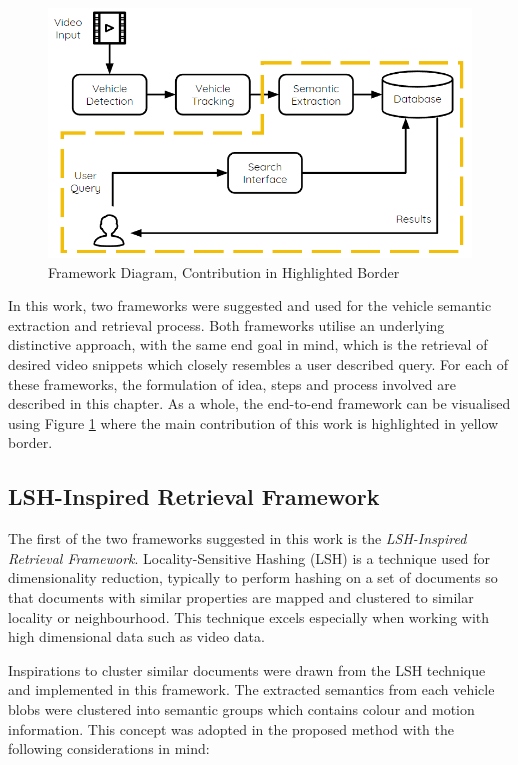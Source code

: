 \begin{figure}[hbt!]\centering
\includegraphics[width=.9\textwidth]{image/new/framework_new.PNG}
\caption{Framework Diagram, Contribution in Highlighted Border}
\label{fig:framework}
\end{figure}


In this work, two frameworks were suggested and used for the vehicle semantic extraction and retrieval process. Both frameworks utilise an underlying distinctive approach, with the same end goal in mind, which is the retrieval of desired video snippets which closely resembles a user described query. For each of these frameworks, the formulation of idea, steps and process involved are described in this chapter. 
As a whole, the end-to-end framework can be visualised using Figure \ref{fig:framework} where the main contribution of this work is highlighted in yellow border. 

\subsection{LSH-Inspired Retrieval Framework}
The first of the two frameworks suggested in this work is the \textit{LSH-Inspired Retrieval Framework}. Locality-Sensitive Hashing (LSH) is a technique used for dimensionality reduction, typically to perform hashing on a set of documents so that documents with similar properties are mapped and clustered to similar locality or neighbourhood. This technique excels especially when working with high dimensional data such as video data.

Inspirations to cluster similar documents were drawn from the LSH technique and implemented in this framework. The extracted semantics from each vehicle blobs were clustered into semantic groups which contains colour and motion information. This concept was adopted in the proposed method with the following considerations in mind: 

